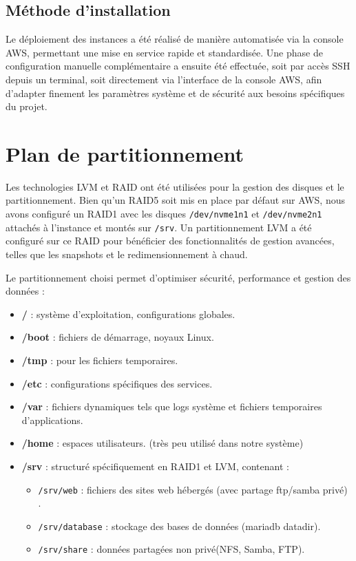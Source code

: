 \documentclass[a4paper,12pt]{article}
\begin{document}
\subsection{Méthode d'installation}

Le déploiement des instances a été réalisé de manière automatisée via la console AWS, permettant une mise en service rapide et standardisée. Une phase de configuration manuelle complémentaire a ensuite été effectuée, soit par accès SSH depuis un terminal, soit directement via l'interface de la console AWS, afin d'adapter finement les paramètres système et de sécurité aux besoins spécifiques du projet.

\section{Plan de partitionnement}

Les technologies LVM et RAID ont été utilisées pour la gestion des disques et le partitionnement. Bien qu'un RAID5 soit mis en place par défaut sur AWS, nous avons configuré un RAID1  avec les disques \texttt{/dev/nvme1n1} et \texttt{/dev/nvme2n1} attachés à l'instance et montés sur \texttt{/srv}. Un partitionnement LVM a été configuré sur ce RAID pour bénéficier des fonctionnalités de gestion avancées, telles que les snapshots et le redimensionnement à chaud.

Le partitionnement choisi permet d'optimiser sécurité, performance et gestion des données :

\begin{itemize}
	\item \textbf{/} : système d'exploitation, configurations globales.
	\item \textbf{/boot} : fichiers de démarrage, noyaux Linux.
	\item \textbf{/tmp} : pour les fichiers temporaires.
	\item \textbf{/etc} : configurations spécifiques des services.
	\item \textbf{/var} : fichiers dynamiques tels que logs système et fichiers temporaires d'applications.
	\item \textbf{/home} : espaces utilisateurs. (très peu utilisé dans notre système)
	\item \textbf{/srv} : structuré spécifiquement en RAID1 et LVM, contenant :
	\begin{itemize}
		\item \texttt{/srv/web} : fichiers des sites web hébergés (avec partage ftp/samba privé) .
		\item \texttt{/srv/database} : stockage des bases de données (mariadb datadir).
		\item \texttt{/srv/share} : données partagées non privé(NFS, Samba, FTP).
	\end{itemize}
\end{itemize}
\end{document}
